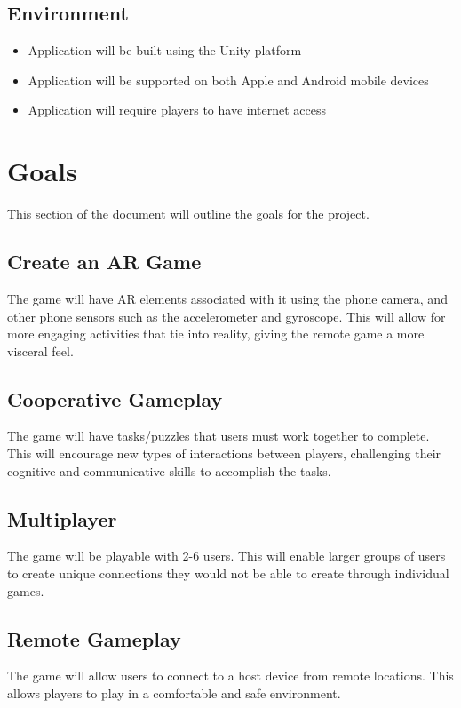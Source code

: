 \documentclass{article}
\begin{document}
\subsection{Environment}

\begin{itemize}
    \item Application will be built using the Unity platform
    \item Application will be supported on both Apple and Android mobile devices
    \item Application will require players to have internet access
\end{itemize}

\section{Goals}
This section of the document will outline the goals for the project.


\subsection{Create an AR Game}
The game will have AR elements associated with it using the phone camera, and other phone sensors such as the accelerometer and gyroscope. This will allow for more engaging activities that tie into reality, giving the remote game a more visceral feel.
\subsection{Cooperative Gameplay}
The game will have tasks/puzzles that users must work together to complete. This will encourage new types of interactions between players, challenging their cognitive and communicative skills to accomplish the tasks.
\subsection{Multiplayer}
The game will be playable with 2-6 users. This will enable larger groups of users to create unique connections they would not be able to create through individual games.
\subsection{Remote Gameplay}
The game will allow users to connect to a host device from remote locations. This allows players to play in a comfortable and safe environment.
\end{document}
